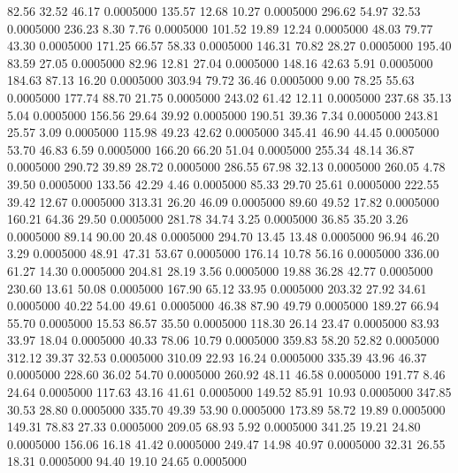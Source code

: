   82.56   32.52   46.17   0.0005000
 135.57   12.68   10.27   0.0005000
 296.62   54.97   32.53   0.0005000
 236.23    8.30    7.76   0.0005000
 101.52   19.89   12.24   0.0005000
  48.03   79.77   43.30   0.0005000
 171.25   66.57   58.33   0.0005000
 146.31   70.82   28.27   0.0005000
 195.40   83.59   27.05   0.0005000
  82.96   12.81   27.04   0.0005000
 148.16   42.63    5.91   0.0005000
 184.63   87.13   16.20   0.0005000
 303.94   79.72   36.46   0.0005000
   9.00   78.25   55.63   0.0005000
 177.74   88.70   21.75   0.0005000
 243.02   61.42   12.11   0.0005000
 237.68   35.13    5.04   0.0005000
 156.56   29.64   39.92   0.0005000
 190.51   39.36    7.34   0.0005000
 243.81   25.57    3.09   0.0005000
 115.98   49.23   42.62   0.0005000
 345.41   46.90   44.45   0.0005000
  53.70   46.83    6.59   0.0005000
 166.20   66.20   51.04   0.0005000
 255.34   48.14   36.87   0.0005000
 290.72   39.89   28.72   0.0005000
 286.55   67.98   32.13   0.0005000
 260.05    4.78   39.50   0.0005000
 133.56   42.29    4.46   0.0005000
  85.33   29.70   25.61   0.0005000
 222.55   39.42   12.67   0.0005000
 313.31   26.20   46.09   0.0005000
  89.60   49.52   17.82   0.0005000
 160.21   64.36   29.50   0.0005000
 281.78   34.74    3.25   0.0005000
  36.85   35.20    3.26   0.0005000
  89.14   90.00   20.48   0.0005000
 294.70   13.45   13.48   0.0005000
  96.94   46.20    3.29   0.0005000
  48.91   47.31   53.67   0.0005000
 176.14   10.78   56.16   0.0005000
 336.00   61.27   14.30   0.0005000
 204.81   28.19    3.56   0.0005000
  19.88   36.28   42.77   0.0005000
 230.60   13.61   50.08   0.0005000
 167.90   65.12   33.95   0.0005000
 203.32   27.92   34.61   0.0005000
  40.22   54.00   49.61   0.0005000
  46.38   87.90   49.79   0.0005000
 189.27   66.94   55.70   0.0005000
  15.53   86.57   35.50   0.0005000
 118.30   26.14   23.47   0.0005000
  83.93   33.97   18.04   0.0005000
  40.33   78.06   10.79   0.0005000
 359.83   58.20   52.82   0.0005000
 312.12   39.37   32.53   0.0005000
 310.09   22.93   16.24   0.0005000
 335.39   43.96   46.37   0.0005000
 228.60   36.02   54.70   0.0005000
 260.92   48.11   46.58   0.0005000
 191.77    8.46   24.64   0.0005000
 117.63   43.16   41.61   0.0005000
 149.52   85.91   10.93   0.0005000
 347.85   30.53   28.80   0.0005000
 335.70   49.39   53.90   0.0005000
 173.89   58.72   19.89   0.0005000
 149.31   78.83   27.33   0.0005000
 209.05   68.93    5.92   0.0005000
 341.25   19.21   24.80   0.0005000
 156.06   16.18   41.42   0.0005000
 249.47   14.98   40.97   0.0005000
  32.31   26.55   18.31   0.0005000
  94.40   19.10   24.65   0.0005000
